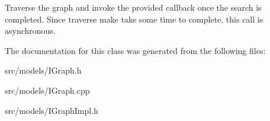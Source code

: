 Traverse the graph and invoke the provided callback once the search is completed. Since traverse make take some time to complete, this call is asynchronous. 

The documentation for this class was generated from the following files\+:\begin{DoxyCompactItemize}
\item 
src/models/I\+Graph.\+h\item 
src/models/I\+Graph.\+cpp\item 
src/models/I\+Graph\+Impl.\+h\end{DoxyCompactItemize}
